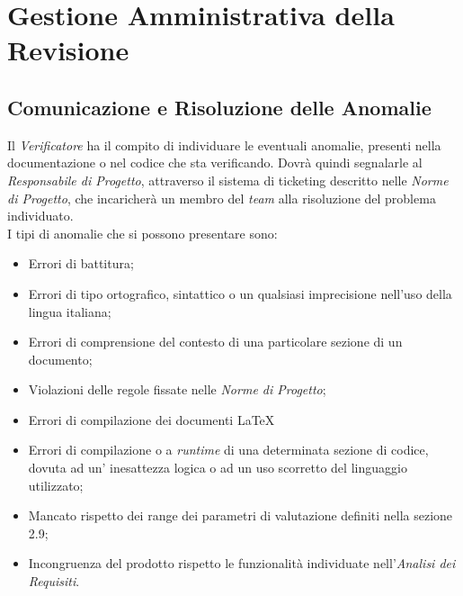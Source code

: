 \newpage
\section{Gestione Amministrativa della Revisione}

\subsection{Comunicazione e Risoluzione delle Anomalie}
Il \textit{Verificatore} ha il compito di individuare le eventuali anomalie, presenti nella documentazione o nel codice che sta verificando. Dovrà quindi segnalarle al \textit{Responsabile di Progetto}, attraverso il sistema di ticketing descritto nelle \textit{Norme di Progetto}, che incaricherà un membro del \textit{team} alla risoluzione del problema individuato.\\ I tipi di anomalie che si possono presentare sono:
\begin{itemize} 
\item Errori di battitura;
\item Errori di tipo ortografico, sintattico o un qualsiasi imprecisione nell'uso della lingua italiana; 
\item Errori di comprensione del contesto di una particolare sezione di un documento;
\item Violazioni delle regole fissate nelle \textit{Norme di Progetto};
\item Errori di compilazione dei documenti \LaTeX~
\item Errori di compilazione o a \textit{runtime} di una determinata sezione di codice, dovuta ad un' inesattezza logica o ad un uso scorretto del linguaggio utilizzato; 
\item Mancato rispetto dei range dei parametri di valutazione definiti nella sezione 2.9;
\item Incongruenza del prodotto rispetto le funzionalità individuate nell’\textit{Analisi dei Requisiti}.
\end{itemize}
